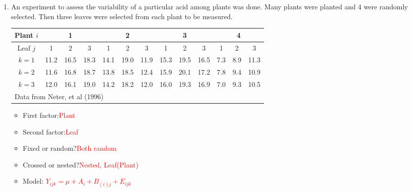 \begin{enumerate}
\item An experiment to assess the variability of a particular acid among plants was done.  Many plants were planted and 4 were randomly selected.  Then three leaves were selected from each plant to be measured.
\begin{large}
\begin{center}
\begin{tabular}{c|ccc|ccc|ccc|ccc}
Plant $i$ & \multicolumn{3}{c}{1} & \multicolumn{3}{c}{2} & \multicolumn{3}{c}{3} & \multicolumn{3}{c}{4}  \\ \hline
Leaf $j$ & 1 & 2 & 3 & 1 & 2 & 3 & 1 & 2 & 3 & 1 & 2 & 3 \\ \hline
$k=1$ & 11.2 & 16.5 & 18.3 & 14.1 & 19.0 & 11.9 & 15.3 & 19.5 & 16.5 & 7.3 & 8.9 & 11.3 \\
$k=2$ & 11.6 & 16.8 & 18.7 & 13.8 & 18.5 & 12.4 & 15.9 & 20.1 & 17.2 & 7.8 & 9.4 & 10.9 \\
$k=3$ & 12.0 & 16.1 & 19.0 & 14.2 & 18.2 & 12.0 & 16.0 & 19.3 & 16.9 & 7.0 & 9.3 & 10.5 \\ \hline
\multicolumn{12}{l}{Data from Neter, et al (1996)}
\end{tabular}
\end{center}
\end{large}

\begin{itemize}
\item First factor:\textcolor{red}{Plant}
\item Second factor:\textcolor{red}{Leaf}
\item Fixed or random?\textcolor{red}{Both random}
\item Crossed or nested?\textcolor{red}{Nested, Leaf(Plant)}
\item Model:  
\textcolor{red}{$Y_{ijk} = \mu + A_i+B_{(i)j}+ E_{ijk}$}
\end{itemize}



\end{enumerate}
